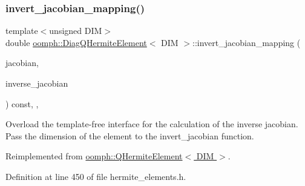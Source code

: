 \subsubsection{\texorpdfstring{invert\+\_\+jacobian\+\_\+mapping()}{invert\_jacobian\_mapping()}}
{\footnotesize\ttfamily template$<$unsigned D\+IM$>$ \\
double \hyperlink{classoomph_1_1DiagQHermiteElement}{oomph\+::\+Diag\+Q\+Hermite\+Element}$<$ D\+IM $>$\+::invert\+\_\+jacobian\+\_\+mapping (\begin{DoxyParamCaption}\item[{const \hyperlink{classoomph_1_1DenseMatrix}{Dense\+Matrix}$<$ double $>$ \&}]{jacobian,  }\item[{\hyperlink{classoomph_1_1DenseMatrix}{Dense\+Matrix}$<$ double $>$ \&}]{inverse\+\_\+jacobian }\end{DoxyParamCaption}) const\hspace{0.3cm}{\ttfamily [inline]}, {\ttfamily [protected]}, {\ttfamily [virtual]}}



Overload the template-\/free interface for the calculation of the inverse jacobian. Pass the dimension of the element to the invert\+\_\+jacobian function. 



Reimplemented from \hyperlink{classoomph_1_1QHermiteElement_a1b5cb1c9b780010ae16a5107d811ce03}{oomph\+::\+Q\+Hermite\+Element$<$ D\+I\+M $>$}.



Definition at line 450 of file hermite\+\_\+elements.\+h.

\mbox{\label{classoomph_1_1DiagQHermiteElement_a0b4a87e67172efe1c68eaac2c7d235a7}} 
